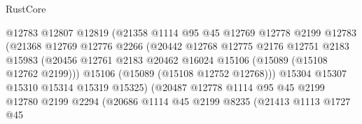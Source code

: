 \begin{lexlean}{RustCore}
\begin{coremodule}
                                    @12783
                                    @12807
                                    @12819
                                    (@21358
                                      @1114
                                      @95
                                      @45
                                      @12769
                                      @12778
                                      @2199
                                      @12783
                                      (@21368
                                        @12769
                                        @12776
                                        @2266
                                        (@20442
                                          @12768
                                          @12775
                                          @2176
                                          @12751
                                          @2183
                                          @15983
                                          (@20456
                                            @12761
                                            @2183
                                            @20462
                                            @16024
                                            @15106
                                            (@15089 (@15108 @12762 @2199)))
                                          @15106
                                          (@15089 (@15108 @12752 @12768)))
                                        @15304
                                        @15307
                                        @15310
                                        @15314
                                        @15319
                                        @15325)
                                      (@20487
                                        @12778
                                        @1114
                                        @95
                                        @45
                                        @2199
                                        @12780
                                        @2199
                                        @2294
                                        (@20686
                                          @1114
                                          @45
                                          @2199
                                          @8235
                                          (@21413
                                            @1113
                                            @1727
                                            @45

\end{coremodule}
\end{lexlean}
